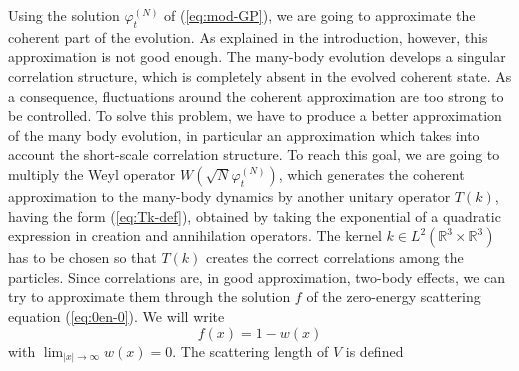 \documentclass[11pt,a4paper]{article}
\newcommand{\bR}{{\mathbb R}}
\begin{document}
\medskip

Using the solution $\varphi_t^{(N)}$ of (\ref{eq:mod-GP}), we are going to approximate the coherent part of the evolution. As explained in the introduction, however, this approximation is not good enough. The many-body evolution develops a singular correlation structure, which is completely absent in the evolved coherent state. As a consequence, fluctuations around the coherent approximation are too strong to be controlled. To solve this problem, we have to produce a better approximation of the many body evolution, in particular an approximation which takes into account the short-scale correlation structure. To reach this goal, we are going to multiply the Weyl operator $W(\sqrt{N} \varphi_t^{(N)})$, which generates the coherent approximation to the many-body dynamics by another unitary operator $T(k)$, having the form (\ref{eq:Tk-def}), obtained by taking the exponential of a quadratic expression in creation and annihilation operators. The kernel $k \in L^2 (\bR^3 \times \bR^3)$ has to be chosen so that $T(k)$ creates the correct correlations among the particles. Since correlations are, in good approximation, two-body effects, we can try to approximate them through the solution $f$ of the zero-energy scattering equation (\ref{eq:0en-0}). We will write 
%
\begin{equation}\label{eq:wdef}
  f (x) = 1 - w (x)
\end{equation}
with $\lim_{|x|\to\infty} w(x) = 0$. The scattering length of $V$ is defined
\end{document}
